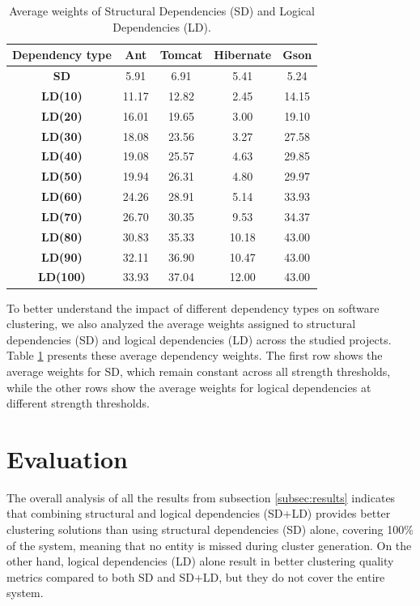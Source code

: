 \documentclass[12pt, a4paper, twoside]{report}
\begin{document}
\begin{table}[htbp]
\centering
\begin{tabular}{|c|c|c|c|c|}
\hline
\textbf{Dependency type} & \textbf{Ant} & \textbf{Tomcat} & \textbf{Hibernate} & \textbf{Gson} \\ \hline
\rowcolor[HTML]{ECECEC}\textbf{SD}     & 5.91  & 6.91  & 5.41  & 5.24  \\
\textbf{LD(10)} & 11.17 & 12.82 & 2.45  & 14.15 \\
\textbf{LD(20)} & 16.01 & 19.65 & 3.00  & 19.10 \\ 
\textbf{LD(30)} & 18.08 & 23.56 & 3.27  & 27.58 \\ 
\textbf{LD(40)} & 19.08 & 25.57 & 4.63  & 29.85 \\ 
\textbf{LD(50)} & 19.94 & 26.31 & 4.80  & 29.97 \\ 
\textbf{LD(60)} & 24.26 & 28.91 & 5.14  & 33.93 \\ 
\textbf{LD(70)} & 26.70 & 30.35 & 9.53  & 34.37 \\ 
\textbf{LD(80)} & 30.83 & 35.33 & 10.18 & 43.00 \\ 
\textbf{LD(90)} & 32.11 & 36.90 & 10.47 & 43.00 \\ 
\textbf{LD(100)} & 33.93 & 37.04 & 12.00 & 43.00 \\
 \hline
\end{tabular}
\caption{Average weights of Structural Dependencies (SD) and Logical Dependencies (LD).}
\label{tab:systems_weights}
\end{table}


To better understand the impact of different dependency types on software clustering, we also analyzed the average weights assigned to structural dependencies (SD) and logical dependencies (LD) across the studied projects. Table \ref{tab:systems_weights} presents these average dependency weights. The first row shows the average weights for SD, which remain constant across all strength thresholds, while the other rows show the average weights for logical dependencies at different strength thresholds.



\section{Evaluation}
\label{sec:evaluation}

The overall analysis of all the results from subsection \ref{subsec:results} indicates that combining structural and logical dependencies (SD+LD) provides better clustering solutions than using structural dependencies (SD) alone, covering 100\% of the system, meaning that no entity is missed during cluster generation. On the other hand, logical dependencies (LD) alone result in better clustering quality metrics compared to both SD and SD+LD, but they do not cover the entire system.
\end{document}
